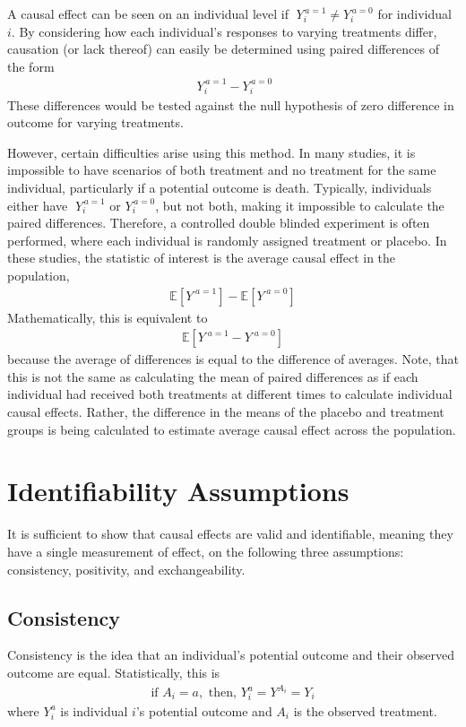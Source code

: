 A causal effect can be seen on an individual level if $\; Y_i^{\, a=1} \neq Y_i^{\, a=0}$ for individual $i$.  By considering how each individual's responses to varying treatments differ, causation (or lack thereof) can easily be determined using paired differences of the form 
\begin{align} \; Y_i^{\, a=1} - Y_i^{\, a=0}\end{align} 
These differences would be tested against the null hypothesis of zero difference in outcome for varying treatments.  

However, certain difficulties arise using this method.  In many studies, it is impossible to have scenarios of both treatment and no treatment for the same individual, particularly if a potential outcome is death.  Typically, individuals either have $\; Y_i^{\, a=1}$ or  $Y_i^{\, a=0}$, but not both, making it impossible to calculate the paired differences.  Therefore, a controlled double blinded experiment is often performed, where each individual is randomly assigned treatment or placebo.  In these studies, the statistic of interest is the average causal effect in the population, 
\begin{align}  \mathbb{E}[Y^{\; a=1}] - \mathbb{E}[Y^{\; a=0}] \end{align} 
Mathematically, this is equivalent to 
\begin{align}  \mathbb{E}[Y^{\; a=1} - Y^{\; a=0}] \end{align}  
because the average of differences is equal to the difference of averages.\cite{hernan_robins_2016} Note, that this is not the same as calculating the mean of paired differences as if each individual had received both treatments at different times to calculate individual causal effects.  Rather, the difference in the means of the placebo and treatment groups is being calculated to estimate average causal effect across the population.  


\section{Identifiability Assumptions} \label{assumptions} 
It is sufficient to show that causal effects are valid and identifiable, meaning they have a single measurement of effect, on the following three assumptions: consistency, positivity, and exchangeability.\cite{cole2009consistency, hernan_robins_2016}   
 
\subsection{Consistency} 
Consistency is the idea that an individual's potential outcome and their observed outcome are equal\cite{cole2009consistency, hernan_robins_2016}.  Statistically, this is 
\begin{align} 
\text{if  } A_i = a, \text{     then,    } Y_i^a = Y^{A_i} = Y_i 
\end{align} 
where $Y_i^a$ is individual $i$'s potential outcome and $A_i$ is the observed treatment.  

